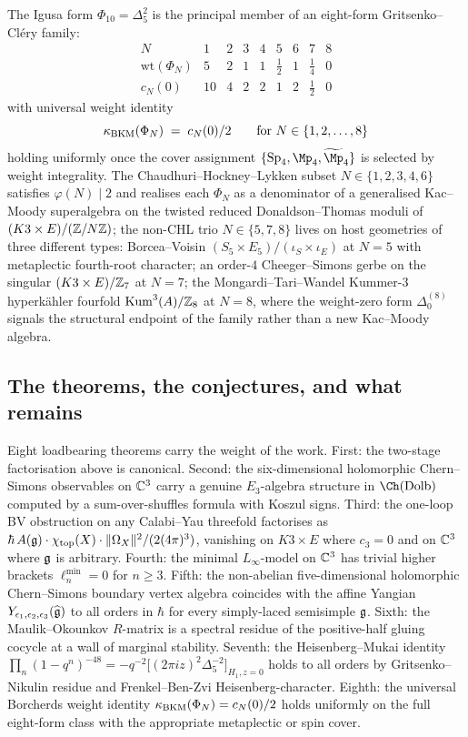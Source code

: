 The Igusa form $\Phi_{10} = \Delta_5^2$ is the principal member of
an eight-form Gritsenko--Cl\'ery family:
\[
\begin{array}{c|cccccccc}
N & 1 & 2 & 3 & 4 & 5 & 6 & 7 & 8 \\[0.3ex]
\hline
\mathrm{wt}(\Phi_N) & 5 & 2 & 1 & 1 & \tfrac{1}{2} & 1 & \tfrac{1}{4} & 0 \\[0.3ex]
c_N(0) & 10 & 4 & 2 & 2 & 1 & 2 & \tfrac{1}{2} & 0
\end{array}
\]
with universal weight identity
\[
\kappa_{\mathrm{BKM}}(\Phi_N) \;=\; c_N(0)/2
\qquad\text{for }N \in \{1, 2, \ldots, 8\}
\]
holding uniformly once the cover assignment
$\{\Sp_4, \Mp_4, \widetilde{\Mp}_4\}$ is selected by weight
integrality. The Chaudhuri--Hockney--Lykken subset
$N \in \{1, 2, 3, 4, 6\}$ satisfies $\varphi(N) \mid 2$ and realises
each $\Phi_N$ as a denominator of a generalised Kac--Moody
superalgebra on the twisted reduced Donaldson--Thomas moduli of
$(K3 \times E)/(\mathbb{Z}/N\mathbb{Z})$; the non-CHL trio $N \in \{5, 7, 8\}$ lives
on host geometries of three different types: Borcea--Voisin
$(S_5 \times E_5)/(\iota_S \times \iota_E)$ at $N = 5$ with metaplectic
fourth-root character; an order-$4$ Cheeger--Simons gerbe on the
singular $(K3 \times E)/\mathbb{Z}_7$ at $N = 7$; the Mongardi--Tari--Wandel
Kummer-$3$ hyperk\"ahler fourfold $\mathrm{Kum}^3(A)/\mathbb{Z}_8$ at $N = 8$,
where the weight-zero form $\Delta_0^{(8)}$ signals the structural
endpoint of the family rather than a new Kac--Moody algebra.

\subsection*{The theorems, the conjectures, and what remains}
\label{wn:sec:platonic-preface-theorems-conjectures-wn}

Eight loadbearing theorems carry the weight of the work. First:
the two-stage factorisation above is canonical. Second: the
six-dimensional holomorphic Chern--Simons observables on $\mathbb{C}^3$
carry a genuine $E_3$-algebra structure in $\Ch(\mathrm{Dolb})$
computed by a sum-over-shuffles formula with Koszul signs. Third:
the one-loop BV obstruction on any Calabi--Yau threefold factorises
as $\hbar \, A(\mathfrak{g}) \cdot \chi_{\mathrm{top}}(X) \cdot \|\Omega_X\|^2
/ (2(4\pi)^3)$, vanishing on $K3 \times E$ where $c_3 = 0$ and on
$\mathbb{C}^3$ where $\mathfrak{g}$ is arbitrary. Fourth: the minimal
$L_\infty$-model on $\mathbb{C}^3$ has trivial higher brackets
$\ell_n^{\min} = 0$ for $n \geq 3$. Fifth: the non-abelian
five-dimensional holomorphic Chern--Simons boundary vertex algebra
coincides with the affine Yangian $Y_{\epsilon_1, \epsilon_2, \epsilon_3}
(\widehat{\mathfrak{g}})$ to all orders in $\hbar$ for every simply-laced
semisimple $\mathfrak{g}$. Sixth: the Maulik--Okounkov $R$-matrix is a
spectral residue of the positive-half gluing cocycle at a wall of
marginal stability. Seventh: the Heisenberg--Mukai identity
$\prod_n (1 - q^n)^{-48} = -q^{-2}
\bigl[(2\pi i z)^2 \Delta_5^{-2}\bigr]_{H_1, z = 0}$
holds to all orders by Gritsenko--Nikulin residue and
Frenkel--Ben-Zvi Heisenberg-character. Eighth: the universal
Borcherds weight identity $\kappa_{\mathrm{BKM}}(\Phi_N) = c_N(0)/2$ holds uniformly
on the full eight-form class with the appropriate metaplectic or spin
cover.

